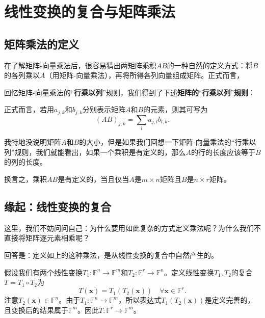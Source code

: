 \section{线性变换的复合与矩阵乘法}

\subsection{矩阵乘法的定义}

在了解矩阵-向量乘法后，很容易猜出两矩阵乘积$AB$的一种自然的定义方式：将$B$的各列乘以$A$（用矩阵-向量乘法），再将所得各列向量组成矩阵。正式而言，
\begin{center}
\end{center}
回忆矩阵-向量乘法的“{\bf 行乘以列}”规则，我们得到了下述{\bf 矩阵的}“{\bf 行乘以列}”{\bf 规则}：
\begin{center}
\end{center}
正式而言，若用$a_{j,k}$和$b_{j,k}$分别表示矩阵$A$和$B$的元素，则其可写为\[(AB)_{j,k}=\sum_{l}a_{j,l}b_{l,k}.\]

我特地没说明矩阵$A$和$B$的大小，但是如果我们回想一下矩阵-向量乘法的“行乘以列”规则，我们就能看出，如果一个乘积是有定义的，那么$A$的行的长度应该等于$B$的列的长度。

换言之，乘积$AB$是有定义的，当且仅当$A$是$m\times n$矩阵且$B$是$n\times r$矩阵。

\subsection{缘起：线性变换的复合}

这里，我们不妨问问自己：为什么要用如此复杂的方式定义乘法呢？为什么我们不直接将矩阵逐元素相乘呢？

回答是：定义如上的这种乘法，是从线性变换的复合中自然产生的。

假设我们有两个线性变换$T_1:\mathbb{F}^n\to\mathbb{F}^m$和$T_2:\mathbb{F}^r\to\mathbb{F}^n$。定义线性变换$T_1,T_2$的复合$T=T_1\circ T_2$为\[T(\mathbf{x})=T_1(T_2(\mathbf{x}))\quad\forall \mathbf{x}\in\mathbb{F}^r.\]
注意$T_{2}(\mathbf{x})\in\mathbb{F}^{n}$。由于$T_{1}:\mathbb{F}^{n}\to\mathbb{F}^{m}$，所以表达式$T_1(T_2(\mathbf{x}))$是定义完善的，且变换后的结果属于$\mathbb{F}^m$。因此$T:\mathbb{F}^{r}\to\mathbb{F}^{m}$。

